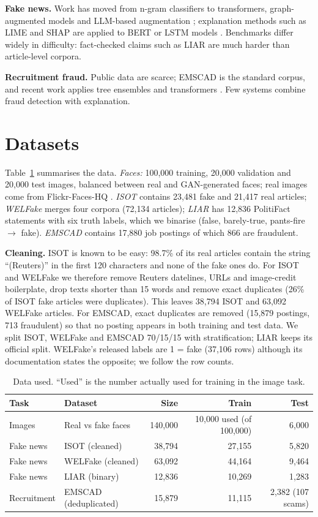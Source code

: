 \documentclass[runningheads]{llncs}
\begin{document}
\textbf{Fake news.} Work has moved from n-gram classifiers \cite{isot} to transformers, graph-augmented models and LLM-based augmentation \cite{r03,r27,r32,r36}; explanation methods such as LIME and SHAP are applied to BERT or LSTM models \cite{r26,r40,lime,shap}. Benchmarks differ widely in difficulty: fact-checked claims such as LIAR \cite{liar} are much harder than article-level corpora.

\textbf{Recruitment fraud.} Public data are scarce; EMSCAD \cite{emscad} is the standard corpus, and recent work applies tree ensembles and transformers \cite{r37,r38}. Few systems combine fraud detection with explanation.

\section{Datasets}
Table~\ref{tab:data} summarises the data. \emph{Faces:} 100,000 training, 20,000 validation and 20,000 test images, balanced between real and GAN-generated faces; real images come from Flickr-Faces-HQ \cite{ffhq}. \emph{ISOT} \cite{isot} contains 23,481 fake and 21,417 real articles; \emph{WELFake} \cite{welfake} merges four corpora (72,134 articles); \emph{LIAR} \cite{liar} has 12,836 PolitiFact statements with six truth labels, which we binarise (false, barely-true, pants-fire $\rightarrow$ fake). \emph{EMSCAD} \cite{emscad} contains 17,880 job postings of which 866 are fraudulent.

\textbf{Cleaning.} ISOT is known to be easy: 98.7\% of its real articles contain the string ``(Reuters)'' in the first 120 characters and none of the fake ones do. For ISOT and WELFake we therefore remove Reuters datelines, URLs and image-credit boilerplate, drop texts shorter than 15 words and remove exact duplicates (26\% of ISOT fake articles were duplicates). This leaves 38,794 ISOT and 63,092 WELFake articles. For EMSCAD, exact duplicates are removed (15,879 postings, 713 fraudulent) so that no posting appears in both training and test data. We split ISOT, WELFake and EMSCAD 70/15/15 with stratification; LIAR keeps its official split. WELFake's released labels are 1 = fake (37,106 rows) although its documentation states the opposite; we follow the row counts.

\begin{table}[t]
\caption{Data used. ``Used'' is the number actually used for training in the image task.}\label{tab:data}
\centering
\begin{tabular}{llrrr}
\toprule
Task & Dataset & Size & Train & Test \\
\midrule
Images & Real vs fake faces & 140,000 & 10,000 used (of 100,000) & 6,000 \\
Fake news & ISOT (cleaned) & 38,794 & 27,155 & 5,820 \\
Fake news & WELFake (cleaned) & 63,092 & 44,164 & 9,464 \\
Fake news & LIAR (binary) & 12,836 & 10,269 & 1,283 \\
Recruitment & EMSCAD (deduplicated) & 15,879 & 11,115 & 2,382 (107 scams) \\
\bottomrule
\end{tabular}
\end{table}
\end{document}
